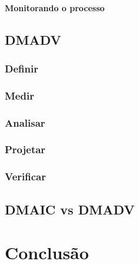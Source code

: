 \documentclass{abnt}
\begin{document}
					\subsubsection {Monitorando o processo}
			\section {DMADV}
				\subsection {Definir}
				\subsection {Medir}
				\subsection {Analisar}
				\subsection {Projetar}
				\subsection {Verificar}
			\section {DMAIC vs DMADV}
	
	\chapter {Conclusão}
\end{document}
